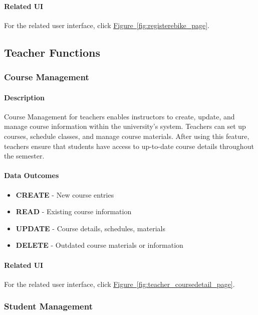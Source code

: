 \documentclass[12pt]{article}
\begin{document}
\paragraph{Related UI}
For the related user interface, click \hyperref[fig:registerebike_page]{Figure~\ref*{fig:registerebike_page}}.

\subsection{Teacher Functions}
\subsubsection{Course Management}

\paragraph{Description}
Course Management for teachers enables instructors to create, update, and manage course information within the university's system. Teachers can set up courses, schedule classes, and manage course materials. After using this feature, teachers ensure that students have access to up-to-date course details throughout the semester.

\paragraph{Data Outcomes}
\begin{itemize}
    \item \textbf{CREATE} - New course entries
    \item \textbf{READ} - Existing course information
    \item \textbf{UPDATE} - Course details, schedules, materials
    \item \textbf{DELETE} - Outdated course materials or information
\end{itemize}

\paragraph{Related UI}
For the related user interface, click \hyperref[fig:teacher_coursedetail_page]{Figure~\ref*{fig:teacher_coursedetail_page}}.

\subsubsection{Student Management}
\end{document}

